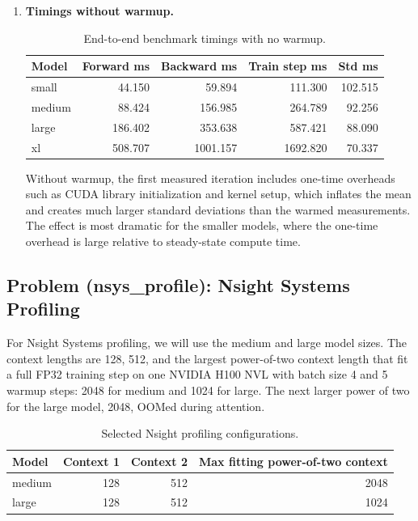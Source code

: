 \documentclass[11pt]{article}
\begin{document}
\begin{enumerate}
  \item \textbf{Timings without warmup.}
  \begin{table}[H]
    \centering
    \caption{End-to-end benchmark timings with no warmup.}
    \begin{tabular}{lrrrr}
      \toprule
      Model & Forward ms & Backward ms & Train step ms & Std ms \\
      \midrule
      small & 44.150 & 59.894 & 111.300 & 102.515 \\
      medium & 88.424 & 156.985 & 264.789 & 92.256 \\
      large & 186.402 & 353.638 & 587.421 & 88.090 \\
      xl & 508.707 & 1001.157 & 1692.820 & 70.337 \\
      \bottomrule
    \end{tabular}
  \end{table}
  Without warmup, the first measured iteration includes one-time overheads such as CUDA library initialization and kernel setup, which inflates the mean and creates much larger standard deviations than the warmed measurements. The effect is most dramatic for the smaller models, where the one-time overhead is large relative to steady-state compute time.
\end{enumerate}

\subsection{Problem (nsys\_profile): Nsight Systems Profiling}

For Nsight Systems profiling, we will use the medium and large model sizes. The context lengths are 128, 512, and the largest power-of-two context length that fit a full FP32 training step on one NVIDIA H100 NVL with batch size 4 and 5 warmup steps: 2048 for medium and 1024 for large. The next larger power of two for the large model, 2048, OOMed during attention.

\begin{table}[H]
  \centering
  \caption{Selected Nsight profiling configurations.}
  \begin{tabular}{lrrr}
    \toprule
    Model & Context 1 & Context 2 & Max fitting power-of-two context \\
    \midrule
    medium & 128 & 512 & 2048 \\
    large & 128 & 512 & 1024 \\
    \bottomrule
  \end{tabular}
\end{table}
\end{document}
